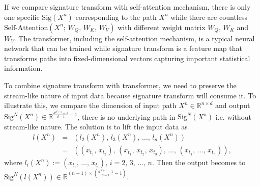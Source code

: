 \documentclass[]{article}
\renewcommand{\(}{\left(}
\renewcommand{\)}{\right)}
\begin{document}
	If we compare signature transform with self-attention mechanism, there is only one specific $\text{Sig}(X^n)$ corresponding to the path $X^n$ while there are countless $\text{Self-Attention}(X^n;\,W_Q,\,W_K,\,W_V)$ with different weight matrix $W_Q,\,W_K$ and $W_V$. The transformer, including the self-attention mechanism, is a typical neural network that can be trained while signature transform is a feature map that transforms paths into fixed-dimensional vectors capturing important statistical information.

	To combine signature transform with transformer, we need to preserve the stream-like nature of input data because signature transform will consume it. To illustrate this, we compare the dimension of input path $X^n\in\mathbb{R}^{n\times d}$ and output $\text{Sig}^N(X^n)\in\mathbb{R}^{\frac{d^{N+1}-1}{d-1}-1}$, there is no underlying path in $\text{Sig}^N(X^n)$ i.e. without stream-like nature. The solution is to lift the input data as
	\begin{eqnarray}
		\label{eq-lift}
		l(X^n)
		&=&(l_2(X^n),\,l_3(X^n),\,\ldots,\,l_n(X^n))\nonumber\\
		&=&((x_{t_1},\,x_{t_2}),\,(x_{t_1},\,x_{t_2},\,x_{t_3}),\,\ldots,\,(x_{t_1},\,\ldots,\,x_{t_n})),
	\end{eqnarray}
	where $l_i(X^n):=(x_{t_1},\,\ldots,\,x_{t_i}),\,i=2,\,3,\,\ldots,\,n$. Then the output becomes to $\text{Sig}^N(l(X^n))\in\mathbb{R}^{(n-1)\times(\frac{d^{N+1}-1}{d-1}-1)}$.
	
\end{document}
